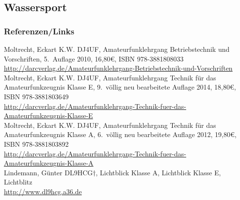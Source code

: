\subsection{Wassersport}

%


\begin{frame}
    \frametitle{Referenzen/Links}
    \hypertarget{refs}{}
    \footnotesize

    \begin{thebibliography}{}
            Moltrecht, Eckart K.W. DJ4UF, Amateurfunklehrgang Betriebstechnik und Vorschriften, 5.~Auflage 2010, 16,80€, ISBN 978-3881808033 \\
                        \url{http://darcverlag.de/Amateurfunklehrgang-Betriebstechnik-und-Vorschriften}
           Moltrecht, Eckart K.W. DJ4UF, Amateurfunklehrgang Technik für das Amateurfunkzeugnis Klasse E, 9.~völlig neu bearbeitete Auflage 2014, 18,80€, ISBN 978-3881803649 \\
                        \url{http://darcverlag.de/Amateurfunklehrgang-Technik-fuer-das-Amateurfunkzeugnis-Klasse-E} \\
           Moltrecht, Eckart K.W. DJ4UF, Amateurfunklehrgang Technik für das Amateurfunkzeugnis Klasse A, 6.~völlig neu bearbeitete Auflage 2012, 19,80€, ISBN 978-3881803892 \\
                        \url{http://darcverlag.de/Amateurfunklehrgang-Technik-fuer-das-Amateurfunkzeugnis-Klasse-A}\\
        	Lindemann, Günter DL9HCG$\dagger$, Lichtblick Klasse A, Lichtblick Klasse E, Lichtblitz \\
          \url{http://www.dl9hcg.a36.de}
    \end{thebibliography}

\end{frame}


